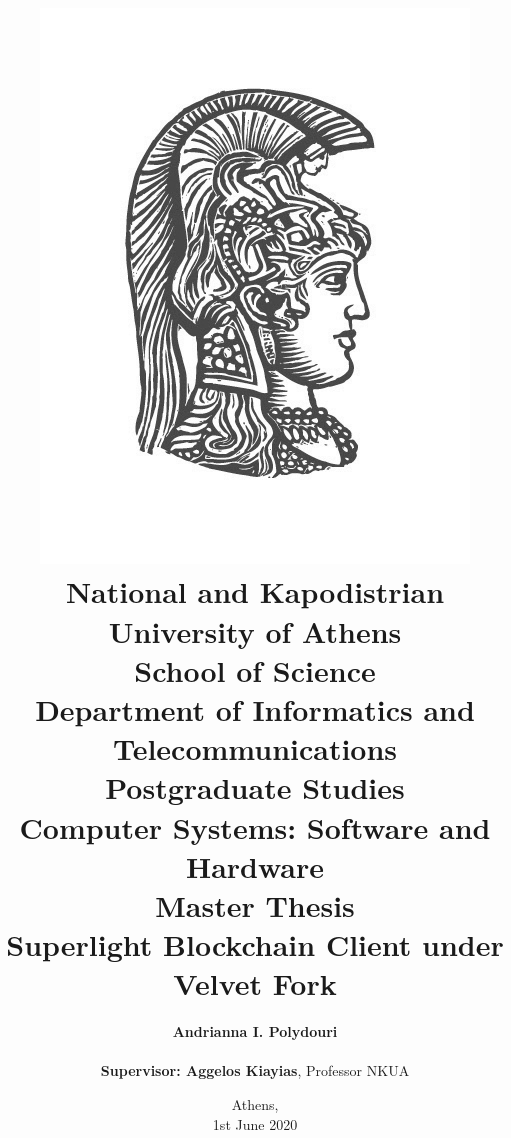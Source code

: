 \title{
    {\includegraphics[scale=0.8]{figures/logo_uoa.jpg}}\\
    {\large National and Kapodistrian University of Athens \\ 
    School of Science \\ 
    Department of Informatics and Telecommunications}\\
    \vspace{1cm}
    Postgraduate Studies \\ 
    Computer Systems: Software and Hardware\\
    \vspace{10mm}
    {Master Thesis}\\
    \vspace{3mm}
    {\textbf{\LARGE Superlight Blockchain Client under Velvet Fork}}\\
    \vspace{1cm}
    }

\author{
    \textbf{Andrianna I. Polydouri} \\ 
    \vspace{1cm} \\ 
    \textbf{Supervisor: Aggelos Kiayias}, Professor NKUA
    \vspace{2cm}
}

\date{Athens, \\ 1st June 2020}